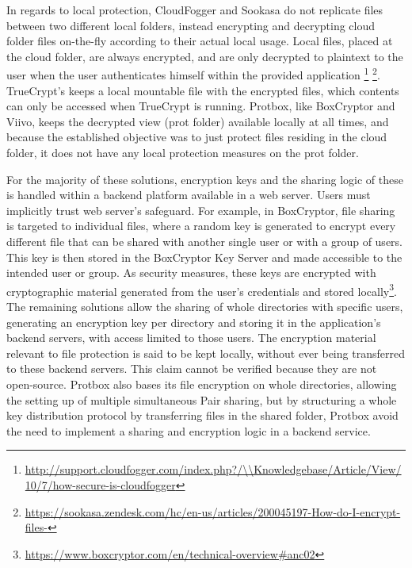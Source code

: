 \documentclass[english]{lni}
\newcommand\protbox{Protbox}
\begin{document}
In regards to local protection, CloudFogger and Sookasa do not
replicate files between two different local
folders, instead encrypting and decrypting cloud
folder files on-the-fly according to their actual local usage.
Local files, placed at the cloud folder, are always encrypted,
and are only decrypted to plaintext to the user
when the user authenticates himself within the provided
application
\footnote{\url{http://support.cloudfogger.com/index.php?/\\Knowledgebase/Article/View/10/7/how-secure-is-cloudfogger}}
\footnote{\url{https://sookasa.zendesk.com/hc/en-us/articles/200045197-How-do-I-encrypt-files-}}.
TrueCrypt's keeps a local mountable file with the encrypted
files, which contents can only be accessed when TrueCrypt is
running. 
{\protbox}, like BoxCryptor and Viivo,
keeps the decrypted view (prot folder) available
locally at all times, and because the established objective was
to just protect files residing in the cloud folder,
it does not have any local protection measures on the prot
folder.











For the majority of these solutions, encryption keys and the sharing
logic of these is handled within a backend platform available in a web server.
Users must implicitly trust web server's safeguard.
For example, in BoxCryptor, file sharing is targeted to individual files,
where a random key is generated to encrypt
every different file that can be shared with another single
user or with a group of users. This key is then stored
in the BoxCryptor Key Server and made accessible to the intended
user or group. As security measures, these keys are encrypted with
cryptographic material generated from the user's credentials and
stored locally\footnote{\url{https://www.boxcryptor.com/en/technical-overview#anc02}}.
The remaining solutions allow the sharing of whole directories with
specific users, generating an encryption key per directory and storing
it in the application's backend servers, with access limited to
those users. The encryption material relevant to file
protection is said to be kept locally, without ever being transferred
to these backend servers. This claim cannot be verified because they
are not open-source.
{\protbox} also bases
its file encryption on whole directories, allowing the setting up
of multiple simultaneous Pair sharing, but by structuring a whole
key distribution protocol by transferring files in the shared folder,
{\protbox} avoid the need to implement a sharing and encryption logic
in a backend service.
\end{document}
